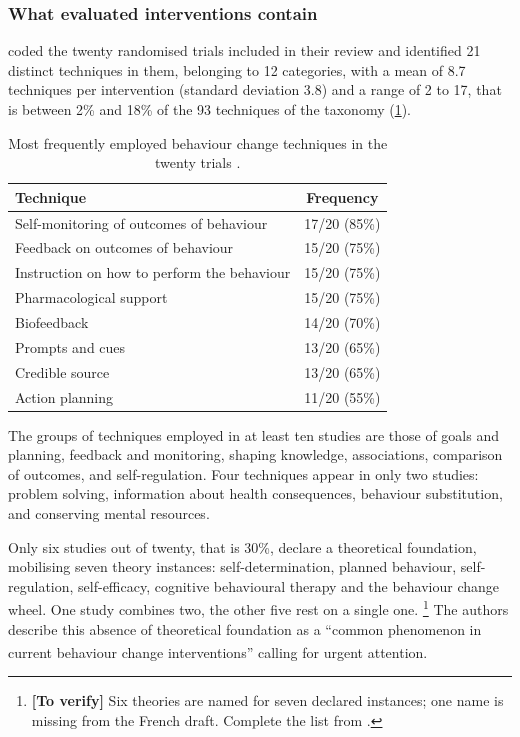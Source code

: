 \documentclass[12pt,a4paper,oneside]{report}
\newcommand{\verify}[1]{\footnote{\textbf{[To verify]} #1}}
\newcommand{\bq}[1]{``#1''\textsuperscript{\dag}}
\begin{document}
\subsubsection{What evaluated interventions contain}

\textcite{zhou2024} coded the twenty randomised trials included in their review and identified 21 distinct techniques in them, belonging to 12 categories, with a mean of 8.7 techniques per intervention (standard deviation 3.8) and a range of 2 to 17, that is between 2\% and 18\% of the 93 techniques of the taxonomy (\cref{tab:bct-trials}).

\begin{table}[htbp]
\centering\small
\caption{Most frequently employed behaviour change techniques in the twenty trials \parencite{zhou2024}.}\label{tab:bct-trials}
\begin{tabularx}{\textwidth}{@{}X c@{}}
\toprule
\textbf{Technique} & \textbf{Frequency} \\
\midrule
Self-monitoring of outcomes of behaviour & 17/20 (85\%) \\
Feedback on outcomes of behaviour & 15/20 (75\%) \\
Instruction on how to perform the behaviour & 15/20 (75\%) \\
Pharmacological support & 15/20 (75\%) \\
Biofeedback & 14/20 (70\%) \\
Prompts and cues & 13/20 (65\%) \\
Credible source & 13/20 (65\%) \\
Action planning & 11/20 (55\%) \\
\bottomrule
\end{tabularx}
\end{table}

The groups of techniques employed in at least ten studies are those of goals and planning, feedback and monitoring, shaping knowledge, associations, comparison of outcomes, and self-regulation. Four techniques appear in only two studies: problem solving, information about health consequences, behaviour substitution, and conserving mental resources.

Only six studies out of twenty, that is 30\%, declare a theoretical foundation, mobilising seven theory instances: self-determination, planned behaviour, self-regulation, self-efficacy, cognitive behavioural therapy and the behaviour change wheel. One study combines two, the other five rest on a single one.%
\verify{Six theories are named for seven declared instances; one name is missing from the French draft. Complete the list from \textcite{zhou2024}.}
The authors describe this absence of theoretical foundation as a \bq{common phenomenon in current behaviour change interventions} calling for urgent attention.
\end{document}
